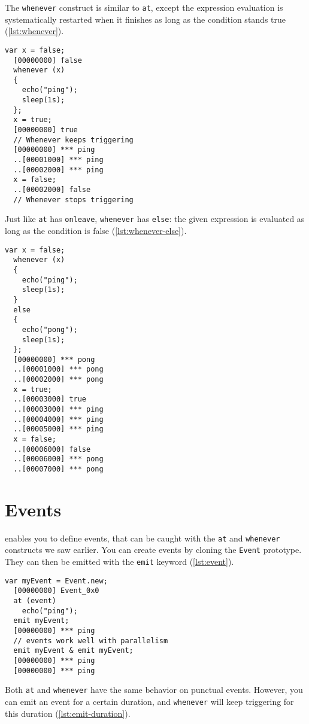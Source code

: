 \documentclass[openright,twoside,12pt]{report}
\begin{document}
The \lstinline|whenever| construct is similar to \lstinline|at|,
except the expression evaluation is systematically restarted when it
finishes as long as the condition stands true (\autoref{lst:whenever}).

\begin{lstlisting}[caption=Using \texttt{whenever}, label=lst:whenever]
  var x = false;
  [00000000] false
  whenever (x)
  {
    echo("ping");
    sleep(1s);
  };
  x = true;
  [00000000] true
  // Whenever keeps triggering
  [00000000] *** ping
  ..[00001000] *** ping
  ..[00002000] *** ping
  x = false;
  ..[00002000] false
  // Whenever stops triggering
\end{lstlisting}

Just like \lstinline|at| has \lstinline|onleave|, \lstinline|whenever|
has \lstinline|else|: the given expression is evaluated as long as the
condition is false (\autoref{lst:whenever-else}).

\begin{lstlisting}[caption=Using \texttt{whenever ... else},
  label=lst:whenever-else]
  var x = false;
  whenever (x)
  {
    echo("ping");
    sleep(1s);
  }
  else
  {
    echo("pong");
    sleep(1s);
  };
  [00000000] *** pong
  ..[00001000] *** pong
  ..[00002000] *** pong
  x = true;
  ..[00003000] true
  ..[00003000] *** ping
  ..[00004000] *** ping
  ..[00005000] *** ping
  x = false;
  ..[00006000] false
  ..[00006000] *** pong
  ..[00007000] *** pong
\end{lstlisting}

\section{Events}

\urbi enables you to define events, that can be caught with the
\lstinline|at| and \lstinline|whenever| constructs we saw earlier. You
can create events by cloning the \lstinline|Event| prototype. They can
then be emitted with the \lstinline|emit| keyword (\autoref{lst:event}).

\begin{lstlisting}[caption=Using events, label=lst:event]
  var myEvent = Event.new;
  [00000000] Event_0x0
  at (event)
    echo("ping");
  emit myEvent;
  [00000000] *** ping
  // events work well with parallelism
  emit myEvent & emit myEvent;
  [00000000] *** ping
  [00000000] *** ping
\end{lstlisting}

Both \lstinline|at| and \lstinline|whenever| have the same behavior on
punctual events. However, you can emit an event for a certain
duration, and \lstinline|whenever| will keep triggering for this
duration (\autoref{lst:emit-duration}).
\end{document}
